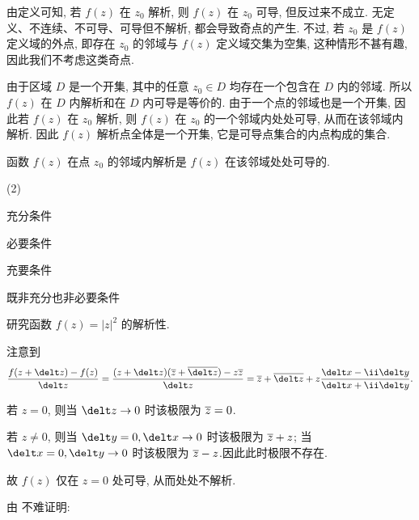
由定义可知, 若 $f(z)$ 在 $z_0$ 解析, 则 $f(z)$ 在 $z_0$ 可导, 但反过来不成立.
无定义、不连续、不可导、可导但不解析, 都会导致奇点的产生.
不过, 若 $z_0$ 是 $f(z)$ 定义域的外点, 即存在 $z_0$ 的邻域与 $f(z)$ 定义域交集为空集, 这种情形不甚有趣, 因此我们不考虑这类奇点.

由于区域 $D$ 是一个开集, 其中的任意 $z_0\in D$ 均存在一个包含在 $D$ 内的邻域. 所以 \alert{$f(z)$ 在 $D$ 内解析和在 $D$ 内可导是等价的}.
由于一个点的邻域也是一个开集, 因此若 $f(z)$ 在 $z_0$ 解析, 则 $f(z)$ 在 $z_0$ 的一个邻域内处处可导, 从而在该邻域内解析. 因此 \alert{$f(z)$ 解析点全体是一个开集}, 它是可导点集合的内点构成的集合.

\begin{exercise}
  函数 $f(z)$ 在点 $z_0$ 的邻域内解析是 $f(z)$ 在该邻域处处可导的\fillbrace{}.
  \begin{examplechoice}(2)
    \item 充分条件
    \item 必要条件
    \item 充要条件
    \item 既非充分也非必要条件
  \end{examplechoice}
\end{exercise}

\begin{example}
  研究函数 $f(z)=|z|^2$ 的解析性.
\end{example}

\begin{solution}
  注意到
  \[
     \frac{f(z+\delt z)-f(z)}{\delt z}
    =\frac{(z+\delt z)(\ov z+\ov{\delt z})-z\ov z}{\delt z}
    =\ov z+\ov{\delt z}
      +z\frac{\delt x-\ii\delt y}{\delt x+\ii\delt y}.
  \]
  \vspace{-\baselineskip}
  \begin{enumr}
    \item 若 $z=0$, 则当 $\delt z\ra 0$ 时该极限为 $\overline z=0$.
    \item 若 $z\neq0$, 则当 $\delt y=0,\delt x\ra 0$ 时该极限为 $\overline z+z$; 当 $\delt x=0,\delt y\ra 0$ 时该极限为 $\overline z-z$.因此此时极限不存在.
  \end{enumr}
  故 $f(z)$ 仅在 $z=0$ 处可导, 从而处处不解析.
\end{solution}

由 不难证明:

